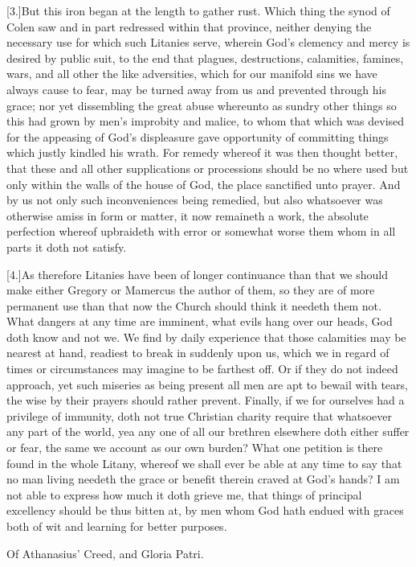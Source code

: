 [3.]But this iron began at the length to gather rust. Which thing the synod of Colen saw and in part redressed within that province, neither denying the necessary use for which such Litanies serve, wherein God’s clemency and mercy is desired by public suit, to the end that plagues, destructions, calamities, famines, wars, and all other the like adversities, which for our manifold sins we have always cause to fear, may  be turned away from us and prevented through his grace;
 nor yet dissembling the great abuse whereunto as sundry other things so this had grown by men’s improbity and malice, to whom that which was devised for the appeasing of God’s displeasure gave opportunity of committing things which justly kindled his wrath. For remedy whereof it was then thought better, that these and all other supplications or processions should be no where used but only within the walls of the house of God, the place sanctified unto prayer. And by us not only such inconveniences being remedied, but also whatsoever was otherwise amiss in form or matter, it now remaineth a work, the absolute perfection whereof upbraideth with error or somewhat worse them whom in all parts it doth not satisfy.

[4.]As therefore Litanies have been of longer continuance than that we should make either Gregory or Mamercus the author of them, so they are of more permanent use than that now the Church should think it needeth them not. What dangers at any time are imminent, what evils hang over our heads, God doth know and not we. We find by daily experience that those calamities may be nearest at hand, readiest to break in suddenly upon us, which we in regard of times or circumstances may imagine to be farthest off. Or if they do not indeed approach, yet such miseries as being present all men are apt to bewail with tears, the wise by their prayers should rather prevent. Finally, if we for ourselves had a privilege of immunity, doth not true Christian charity require that whatsoever any part of the world, yea any one of all our brethren elsewhere doth either suffer or fear, the same we account as our own burden? What one petition is there found in the whole Litany, whereof we shall ever be able at any time to say that no man living needeth the grace or benefit therein craved at God’s hands? I am not able to express how much it doth grieve me, that things of principal excellency should be thus bitten at, by men whom God hath endued with graces both of wit and learning for better purposes.


Of Athanasius’ Creed, and Gloria Patri.
